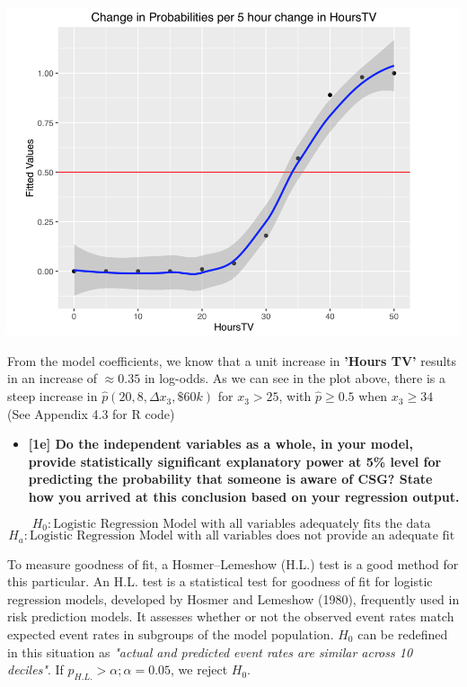 \documentclass[10pt, oneside,spanish]{article}
\begin{document}
\begin{center}
\includegraphics[width=15cm]{1d.png}
\end{center}



From the model coefficients, we know that a unit increase in \textbf{'Hours TV'} results in an increase of $ \approx 0.35$ in log-odds. As we can see in the plot above, there is a steep increase in $\hat{p}(20,8,\Delta x_3,\$60k)$ for $x_3 > 25 $, with $\hat{p} \geq 0.5 $ when $x_3 \geq  34 $ (See Appendix 4.3 for R code)

\pagebreak


\begin{itemize}
\item \textbf{[1e] Do the independent variables as a whole, in your model, provide statistically significant explanatory power at 5\% level for predicting the probability that someone is aware of CSG?  State how you arrived at this conclusion based on your regression output.}
\end{itemize}

$$ H_0 : \textrm{Logistic Regression Model with all variables adequately fits the data  }$$
$$ H_a : \textrm{Logistic Regression Model with all variables does not provide an adequate fit } $$

To measure goodness of fit, a Hosmer–Lemeshow (H.L.) test is a good method for this particular. An H.L. test is a statistical test for goodness of fit for logistic regression models, developed by Hosmer and Lemeshow (1980), frequently used in risk prediction models. It assesses whether or not the observed event rates match expected event rates in subgroups of the model population. $H_0 $ can be redefined in this situation as \textit{"actual and predicted event rates are similar across 10 deciles"}. If $p_{H.L.} > \alpha; \alpha = 0.05 $, we reject $H_0$.
\end{document}
